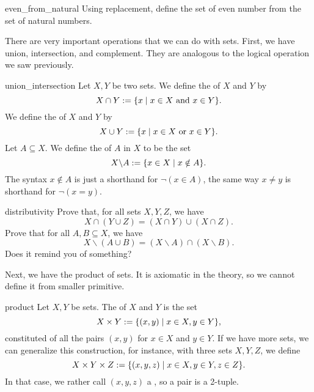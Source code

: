 \begin{cex}{}{even_from_natural}
    Using replacement, define the set of even number from the set of natural numbers.
\end{cex}

There are very important operations that we can do with sets. First, we have union, intersection, and complement. They are analogous to the logical operation we saw previously.

\begin{cdef}{}{union_intersection}
    Let \( X, Y \) be two sets. We define the  of \( X \) and \( Y \) by
    \begin{equation*}
        X \cap Y := \{ x \mid x \in X \text{ and } x \in Y \}.
    \end{equation*}
    We define the  of \( X \) and \( Y \) by
    \begin{equation*}
        X \cup Y := \{ x \mid x \in X \text{ or } x \in Y \}.
    \end{equation*}
    Let \( A \subseteq X \). We define the  of \( A \) in \( X \) to be the set
    \begin{equation*}
        X \backslash A := \{ x \in X \mid x \notin A \}.
    \end{equation*}
    The syntax \( x \notin A \) is just a shorthand for \( \neg (x \in A) \), the same way \( x \neq y \) is shorthand for \( \neg (x = y) \).
\end{cdef}

\begin{cex}{}{distributivity}
    Prove that, for all sets \( X, Y, Z \), we have 
    \begin{equation*}
        X \cap (Y \cup Z) = (X \cap Y) \cup (X \cap Z).
    \end{equation*}
    Prove that for all \( A, B \subseteq X \), we have
    \begin{equation*}
        X \backslash (A \cup B) = (X \backslash A) \cap (X \backslash B).
    \end{equation*}
    Does it remind you of something?
\end{cex}

Next, we have the product of sets. It is axiomatic in the theory, so we cannot define it from smaller primitive.
\begin{cdef}{}{product}
    Let \( X, Y \) be sets. The  of \( X \) and \( Y \) is the set
    \begin{equation*}
        X \times Y := \{ (x, y) \mid x \in X, y \in Y \},
    \end{equation*}
    constituted of all the pairs \( (x, y) \) for \( x \in X \) and \( y \in Y \).
    If we have more sets, we can generalize this construction, for instance, with three sets \( X, Y, Z \), we define
    \begin{equation*}
        X \times Y \times Z := \{ (x, y, z) \mid x \in X, y \in Y, z \in Z \}.
    \end{equation*}
    In that case, we rather call \( (x, y, z) \) a , so a pair is a 2-tuple.
\end{cdef}

